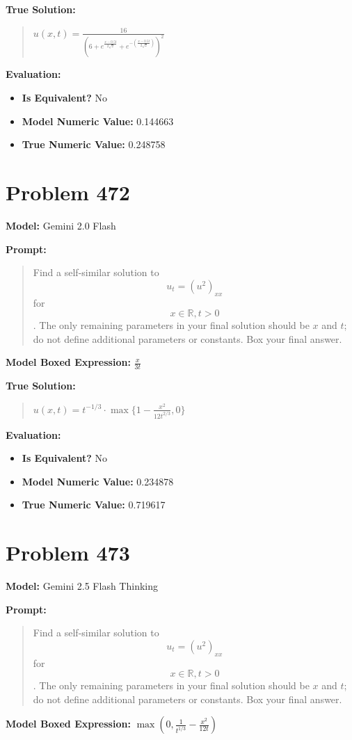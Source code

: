 \documentclass{article}
\begin{document}
\textbf{True Solution:}
\begin{quote}
$u(x,t) = \frac{16}{\left(6 + e^{\frac{x-0.5t}{2\sqrt{2}}} + e^{-\left(\frac{x-0.5t}{2\sqrt{2}}\right)}\right)^2}$
\end{quote}

\textbf{Evaluation:}
\begin{itemize}
\item \textbf{Is Equivalent?} No
\item \textbf{Model Numeric Value:} 0.144663
\item \textbf{True Numeric Value:} 0.248758
\end{itemize}
\vspace{1cm}
\section*{Problem 472}
\textbf{Model:} Gemini 2.0 Flash

\textbf{Prompt:}
\begin{quote}
Find a self-similar solution to $$u_t=(u^2)_{xx}$$ for $$x\in \mathbb{R}, t>0$$. The only remaining parameters in your final solution should be $x$ and $t$; do not define additional parameters or constants. Box your final answer.
\end{quote}
\textbf{Model Boxed Expression:} $\frac{x}{3t}$

\textbf{True Solution:}
\begin{quote}
$u(x,t)=t^{-1/3}\cdot\max\{1-\frac{x^2}{12t^{2/3}},0\}$
\end{quote}

\textbf{Evaluation:}
\begin{itemize}
\item \textbf{Is Equivalent?} No
\item \textbf{Model Numeric Value:} 0.234878
\item \textbf{True Numeric Value:} 0.719617
\end{itemize}
\vspace{1cm}
\section*{Problem 473}
\textbf{Model:} Gemini 2.5 Flash Thinking

\textbf{Prompt:}
\begin{quote}
Find a self-similar solution to $$u_t=(u^2)_{xx}$$ for $$x\in \mathbb{R}, t>0$$. The only remaining parameters in your final solution should be $x$ and $t$; do not define additional parameters or constants. Box your final answer.
\end{quote}
\textbf{Model Boxed Expression:} $\max\left(0, \frac{1}{t^{1/3}} - \frac{x^2}{12t}\right)$
\end{document}
